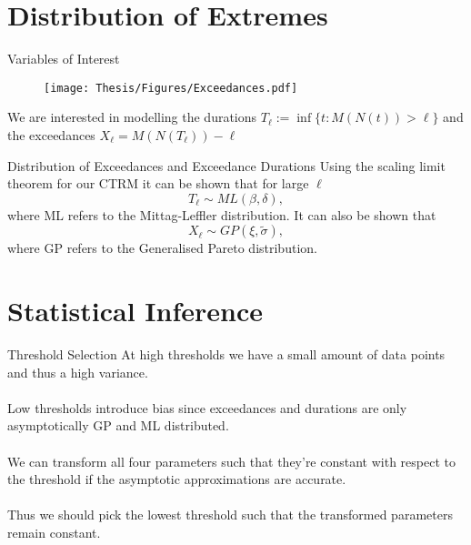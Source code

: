 \documentclass{beamer}
\begin{document}
\section{Distribution of Extremes}

\begin{frame}{Variables of Interest}

    \begin{figure}
        \centering
        \vspace{-0.5cm}
        \hspace{-0cm}
        \texttt{[image: Thesis/Figures/Exceedances.pdf]}
    \end{figure}
    We are interested in modelling the durations $T_\ell := \inf\{t: M(N(t)) > \ell\}$ and the exceedances $X_\ell=M(N(T_\ell))-\ell$    
\end{frame}



\begin{frame}{Distribution of Exceedances and Exceedance Durations}
        Using the scaling limit theorem for our CTRM it can be shown that for large $\ell$
        \[
            T_\ell \sim ML(\beta,\delta),
        \]
	where ML refers to the Mittag-Leffler distribution. It can also be shown that
	\[
            X_\ell \sim GP(\xi,\tilde{\sigma}),
        \]
        where GP refers to the Generalised Pareto distribution.
\end{frame}

\section{Statistical Inference}

\begin{frame}{Threshold Selection}
At high thresholds we have a small amount of data points and thus a high variance.
\\~\\
Low thresholds introduce bias since exceedances and durations are only asymptotically GP and ML distributed.
\\~\\
We can transform all four parameters such that they're constant with respect to the threshold if the asymptotic approximations are accurate.
\\~\\
Thus we should pick the lowest threshold such that the transformed parameters remain constant.

\end{frame}
\end{document}
